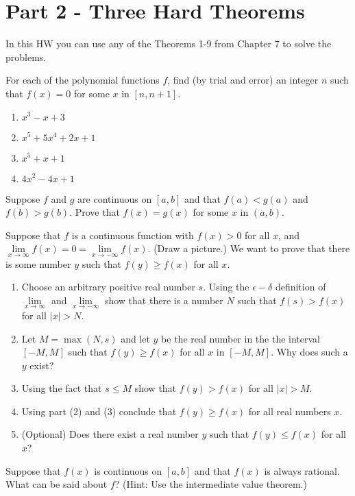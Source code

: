 \documentclass[9pt, a4paper, oneside]{amsart}
\begin{document}
\section*{Part 2 - Three Hard Theorems}
In this HW you can use any of the Theorems 1-9 from Chapter 7 to solve the problems.
\begin{questions}[resume]
	\item For each of the polynomial functions $ f$, find (by trial and error) an integer $ n$ such that $ f(x) = 0$ for some $ x$ in  $[n,n+1]$.
	\begin{multicols}{2}
		\begin{enumerate}
			\item $ x^3 - x + 3$
			\item $ x^5 + 5x^4 + 2x + 1$
			\item $ x^5 + x +1$
			\item $ 4x^2 - 4x + 1$
		\end{enumerate}
	\end{multicols}

	\item Suppose $ f$ and $ g$ are continuous on $ [a,b]$ and that $ f(a) < g(a)$ and $ f(b) > g(b)$. Prove that $ f(x) = g(x)$ for some $ x$ in $ (a,b)$.

	\item Suppose that $ f$ is a continuous function with $ f(x) > 0$ for all $ x$, and $ \lim \limits_{x \rightarrow \infty} f(x) = 0 = \lim \limits_{x \rightarrow -\infty} f(x)$. (Draw a picture.) We want to prove that there is some number $ y$ such that $ f(y) \ge f(x)$ for all $ x$.
	\begin{enumerate}
		\item Choose an arbitrary positive real number $s$. Using the $ \epsilon - \delta $ definition of $ \lim \limits _ {x \rightarrow \infty}$ and $ \lim \limits _ {x \rightarrow -\infty}$ show that there is a number $ N$ such that $f(s) > f(x)$ for all $ |x| > N$.
		\item Let $ M = \max(N,s)$ and let $ y$ be the real number in the the interval $ [-M,M]$ such that $ f(y) \ge f(x)$ for all $ x$ in $[-M,M]$. Why does such a $ y$ exist?
		\item Using the fact that $ s \le M$ show that $ f(y) > f(x)$ for all $ |x| > M$.
		\item  Using part (2) and (3) conclude that $ f(y) \ge f(x)$ for all real numbers $ x$.

		\item (Optional) Does there exist a real number $ y$ such that $ f(y) \le f(x)$ for all $ x$?
	\end{enumerate}

	\item Suppose that $ f(x)$ is continuous on $ [a,b]$ and that $ f(x)$ is always rational. What can be said about $ f$? (Hint: Use the intermediate value theorem.)

\end{questions}
\end{document}
